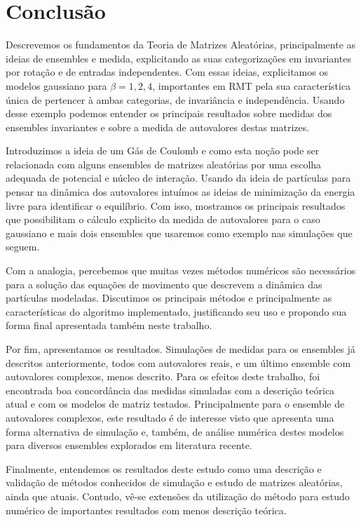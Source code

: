 \chapter{Conclusão}
\label{Capitulo: Conclusão}

Descrevemos os fundamentos da Teoria de Matrizes Aleatórias, principalmente as ideias de ensembles e medida, explicitando as suas categorizações em invariantes por rotação e de entradas independentes. Com essas ideias, explicitamos os modelos gaussiano para $\beta = 1,2,4$, importantes em RMT pela sua característica única de pertencer à ambas categorias, de invariância e independência. Usando desse exemplo podemos entender os principais resultados sobre medidas dos ensembles invariantes e sobre a medida de autovalores destas matrizes.
 
Introduzimos a ideia de um Gás de Coulomb e como esta noção pode ser relacionada com alguns ensembles de matrizes aleatórias por uma escolha adequada de potencial e núcleo de interação. Usando da ideia de partículas para pensar na dinâmica dos autovalores intuímos as ideias de minimização da energia livre para identificar o equilíbrio. Com isso, mostramos os principais resultados que possibilitam o cálculo explicito da medida de autovalores para o caso gaussiano e mais dois ensembles que usaremos como exemplo nas simulações que seguem.

Com a analogia, percebemos que muitas vezes métodos numéricos são necessários para a solução das equações de movimento que descrevem a dinâmica das partículas modeladas. Discutimos os principais métodos e principalmente as características do algoritmo implementado, justificando seu uso e propondo sua forma final apresentada também neste trabalho.

Por fim, apresentamos os resultados. Simulações de medidas para os ensembles já descritos anteriormente, todos com autovalores reais, e um último ensemble com autovalores complexos, menos descrito. Para os efeitos deste trabalho, foi encontrada boa concordância das medidas simuladas com a descrição teórica atual e com os modelos de matriz testados. Principalmente para o ensemble de autovalores complexos, este resultado é de interesse visto que apresenta uma forma alternativa de simulação e, também, de análise numérica destes modelos para diversos ensembles explorados em literatura recente.

Finalmente, entendemos os resultados deste estudo como uma descrição e validação de métodos conhecidos de simulação e estudo de matrizes aleatórias, ainda que atuais. Contudo, vê-se extensões da utilização do método para estudo numérico de importantes resultados com menos descrição teórica.
